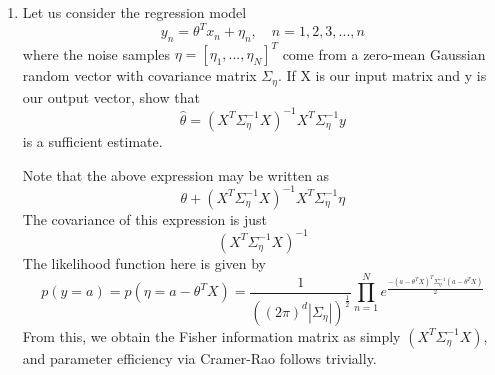\documentclass{article}
\newcommand{\chapternumber}{3}
\newenvironment{QandA}{\begin{enumerate}[label=\chapternumber.\arabic*]\bfseries\boldmath}
	{\end{enumerate}}
\newenvironment{answered}{\par\bigskip\normalfont\unboldmath}{}
\begin{document}
\begin{QandA}
		\item Let us consider the regression model
		\[y_n=\theta^Tx_n + \eta_n,\quad n=1,2,3,...,n\]
		where the noise samples $\eta=[\eta_1,...,\eta_N]^T$ come from a zero-mean Gaussian random vector with covariance matrix $\Sigma_\eta$. If X is our input matrix and y is our output vector, show that 
		\[\hat\theta=(X^T\Sigma_\eta^{-1}X)^{-1}X^T\Sigma_\eta^{-1} y\]
		is a sufficient estimate.
		
		\begin{answered}
			Note that the above expression may be written as 
			\[\theta+(X^T\Sigma_\eta^{-1}X)^{-1}X^T\Sigma_\eta^{-1} \eta\]
			The covariance of this expression is just
			\[(X^T\Sigma_\eta^{-1}X)^{-1}\]
			\newline
			The likelihood function here is given by 
			\[p(y=a)=p(\eta=a-\theta^TX)=\frac{1}{((2\pi)^d |\Sigma_\eta|)^{\frac{1}{2}}}\prod_{n=1}^{N}e^\frac{-(a-\theta^TX)^T\Sigma_\eta^{-1} (a-\theta^TX)}{2}\]
			From this, we obtain the Fisher information matrix as simply $(X^T\Sigma_\eta^{-1}X)$, and parameter efficiency via Cramer-Rao follows trivially.
		\end{answered}
		
	\end{QandA}
	
\end{document}
